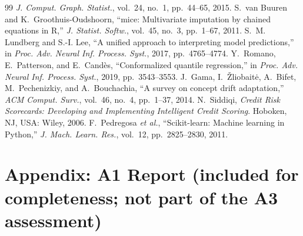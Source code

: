 \documentclass[conference,a4paper]{IEEEtran}
\begin{document}
\begin{thebibliography}{99}
\emph{J. Comput. Graph. Statist.}, vol.~24, no.~1, pp.~44--65, 2015.
 S.~van Buuren and K.~Groothuis-Oudshoorn, ``mice: Multivariate
imputation by chained equations in R,'' \emph{J. Statist. Softw.}, vol.~45, no.~3, pp.~1--67, 2011.
 S.~M. Lundberg and S.-I. Lee, ``A unified approach to interpreting model
predictions,'' in \emph{Proc. Adv. Neural Inf. Process. Syst.}, 2017, pp.~4765--4774.
 Y.~Romano, E.~Patterson, and E.~Cand\`es, ``Conformalized quantile
regression,'' in \emph{Proc. Adv. Neural Inf. Process. Syst.}, 2019, pp.~3543--3553.
 J.~Gama, I.~\v{Z}liobait\.{e}, A.~Bifet, M.~Pechenizkiy, and A.~Bouchachia, ``A
survey on concept drift adaptation,'' \emph{ACM Comput. Surv.}, vol.~46, no.~4, pp.~1--37, 2014.
 N.~Siddiqi, \emph{Credit Risk Scorecards: Developing and Implementing
Intelligent Credit Scoring}. Hoboken, NJ, USA: Wiley, 2006.
 F.~Pedregosa \emph{et al.}, ``Scikit-learn: Machine learning in Python,''
\emph{J. Mach. Learn. Res.}, vol.~12, pp.~2825--2830, 2011.
\end{thebibliography}

\onecolumn
\appendix
\section*{Appendix: A1 Report (included for completeness; not part of the A3 assessment)}

\end{document}
